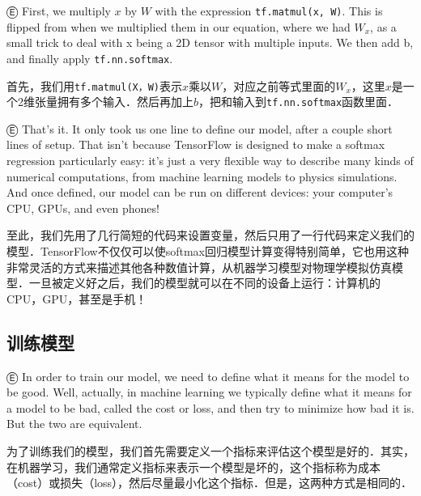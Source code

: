 Ⓔ First, we multiply $x$ by $W$ with the expression \lstinline{tf.matmul(x, W)}. This is flipped from when we multiplied them in our equation, where we had $W_x$, as a small trick to deal with x being a 2D tensor with multiple inputs. We then add b, and finally apply \lstinline{tf.nn.softmax}.

首先，我们用\lstinline{tf.matmul(X，W)}表示$x$乘以$W$，对应之前等式里面的$W_x$，这里$x$是一个2维张量拥有多个输入．然后再加上$b$，把和输入到\lstinline{tf.nn.softmax}函数里面．

Ⓔ That's it. It only took us one line to define our model, after a couple short lines of setup. That isn't because TensorFlow is designed to make a softmax regression particularly easy: it's just a very flexible way to describe many kinds of numerical computations, from machine learning models to physics simulations. And once defined, our model can be run on different devices: your computer's CPU, GPUs, and even phones!

至此，我们先用了几行简短的代码来设置变量，然后只用了一行代码来定义我们的模型．TensorFlow不仅仅可以使softmax回归模型计算变得特别简单，它也用这种非常灵活的方式来描述其他各种数值计算，从机器学习模型对物理学模拟仿真模型．一旦被定义好之后，我们的模型就可以在不同的设备上运行：计算机的CPU，GPU，甚至是手机！

\subsection{训练模型}

Ⓔ In order to train our model, we need to define what it means for the model to be good. Well, actually, in machine learning we typically define what it means for a model to be bad, called the cost or loss, and then try to minimize how bad it is. But the two are equivalent.

为了训练我们的模型，我们首先需要定义一个指标来评估这个模型是好的．其实，在机器学习，我们通常定义指标来表示一个模型是坏的，这个指标称为成本（cost）或损失（loss），然后尽量最小化这个指标．但是，这两种方式是相同的．

